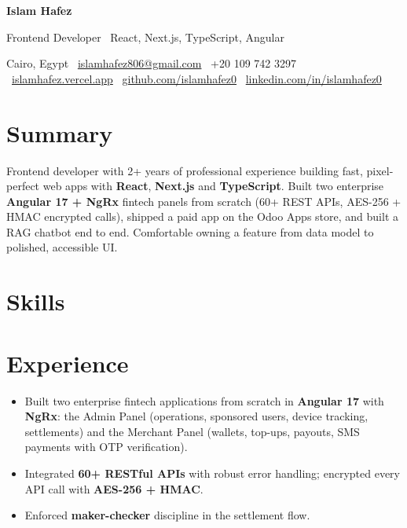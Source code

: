 \documentclass[10pt,a4paper]{article}
\begin{document}
{\LARGE\bfseries\color{accent} Islam Hafez}\par\vspace{2pt}
{\large Frontend Developer \textbar\ React, Next.js, TypeScript, Angular}\par\vspace{4pt}
{\small Cairo, Egypt \textbar\ \href{mailto:islamhafez806@gmail.com}{islamhafez806@gmail.com} \textbar\ +20 109 742 3297 \textbar\ \href{https://islamhafez.vercel.app}{islamhafez.vercel.app} \textbar\ \href{https://github.com/islamhafez0}{github.com/islamhafez0} \textbar\ \href{https://www.linkedin.com/in/islamhafez0}{linkedin.com/in/islamhafez0}}

\section*{Summary}
Frontend developer with 2+ years of professional experience building fast, pixel-perfect web apps with
\textbf{React}, \textbf{Next.js} and \textbf{TypeScript}. Built two enterprise \textbf{Angular 17 + NgRx}
fintech panels from scratch (60+ REST APIs, AES-256 + HMAC encrypted calls), shipped a paid app on the
Odoo Apps store, and built a RAG chatbot end to end. Comfortable owning a feature from data
model to polished, accessible UI.

\section*{Skills}

\section*{Experience}
\begin{itemize}
  \item Built two enterprise fintech applications from scratch in \textbf{Angular 17} with \textbf{NgRx}: the Admin Panel
        (operations, sponsored users, device tracking, settlements) and the Merchant Panel (wallets, top-ups, payouts,
        SMS payments with OTP verification).
  \item Integrated \textbf{60+ RESTful APIs} with robust error handling; encrypted every API call with \textbf{AES-256 + HMAC}.
  \item Enforced \textbf{maker-checker} discipline in the settlement flow.
\end{itemize}
\end{document}
